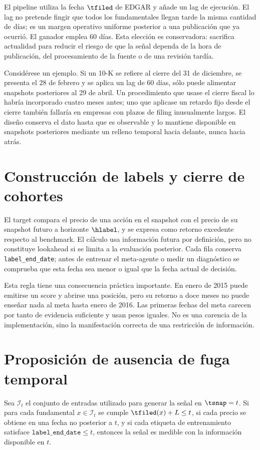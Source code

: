 El pipeline utiliza la fecha \(\tfiled\) de EDGAR y añade un lag de ejecución. El lag no pretende
fingir que todos los fundamentales llegan tarde la misma cantidad de días; es un margen operativo
uniforme posterior a una publicación que ya ocurrió. El ganador emplea 60 días. Esta elección es
conservadora: sacrifica actualidad para reducir el riesgo de que la señal dependa de la hora de
publicación, del procesamiento de la fuente o de una revisión tardía.

Considérese un ejemplo. Si un 10-K se refiere al cierre del 31 de diciembre, se presenta el 28 de
febrero y se aplica un lag de 60 días, sólo puede alimentar snapshots posteriores al 29 de abril. Un
procedimiento que usase el cierre fiscal lo habría incorporado cuatro meses antes; uno que aplicase
un retardo fijo desde el cierre también fallaría en empresas con plazos de filing inusualmente
largos. El diseño conserva el dato hasta que es observable y lo mantiene disponible en snapshots
posteriores mediante un relleno temporal hacia delante, nunca hacia atrás.

\section{Construcción de labels y cierre de cohortes}

El target compara el precio de una acción en el snapshot con el precio de su snapshot futuro a
horizonte \(\hlabel\), y se expresa como retorno excedente respecto al benchmark. El cálculo usa
información futura por definición, pero no constituye lookahead si se limita a la evaluación
posterior. Cada fila conserva \texttt{label\_end\_date}; antes de entrenar el meta-agente o medir
un diagnóstico se comprueba que esta fecha sea menor o igual que la fecha actual de decisión.

Esta regla tiene una consecuencia práctica importante. En enero de 2015 puede emitirse un score y
abrirse una posición, pero su retorno a doce meses no puede enseñar nada al meta hasta enero de
2016. Las primeras fechas del meta carecen por tanto de evidencia suficiente y usan pesos iguales.
No es una carencia de la implementación, sino la manifestación correcta de una restricción de
información.

\section{Proposición de ausencia de fuga temporal}

\begin{proposicion}
\label{prop:sin-fuga}
Sea $\mathcal{I}_t$ el conjunto de entradas utilizado para generar la señal en
\(\tsnap=t\). Si para cada fundamental $x\in\mathcal{I}_t$ se cumple
$\tfiled(x)+L\leq t$, si cada precio se obtiene en una fecha no posterior a $t$, y si cada etiqueta
de entrenamiento satisface $\texttt{label\_end\_date}\leq t$, entonces la señal es medible con la
información disponible en $t$.
\end{proposicion}

